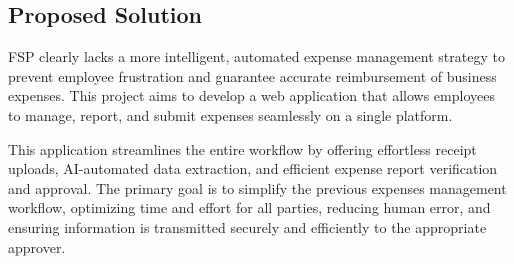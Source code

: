 \subsection{Proposed Solution}
\label{sec:proposed-solution}

FSP clearly lacks a more intelligent, automated expense management strategy to prevent employee frustration and guarantee accurate reimbursement of business expenses. This project aims to develop a web application that allows employees to manage, report, and submit expenses seamlessly on a single platform. 


This application streamlines the entire workflow by offering effortless receipt uploads, AI-automated data extraction, and efficient expense report verification and approval. The primary goal is to simplify the previous expenses management workflow, optimizing time and effort for all parties,  reducing human error, and ensuring information is transmitted securely and efficiently to the appropriate approver. 
